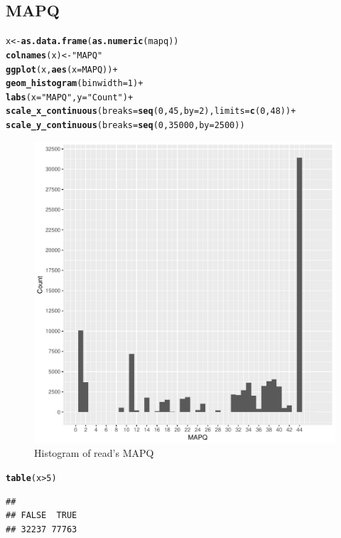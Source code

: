 \documentclass[12pt, a4paper]{article}\usepackage[]{graphicx}\usepackage[]{color}
\makeatletter
\def\maxwidth{ %
  \ifdim\Gin@nat@width>\linewidth
    \linewidth
  \else
    \Gin@nat@width
  \fi
}
\newcommand{\hlnum}[1]{\textcolor[rgb]{0.686,0.059,0.569}{#1}}%
\newcommand{\hlstr}[1]{\textcolor[rgb]{0.192,0.494,0.8}{#1}}%
\newcommand{\hlopt}[1]{\textcolor[rgb]{0,0,0}{#1}}%
\newcommand{\hlstd}[1]{\textcolor[rgb]{0.345,0.345,0.345}{#1}}%
\newcommand{\hlkwb}[1]{\textcolor[rgb]{0.69,0.353,0.396}{#1}}%
\newcommand{\hlkwc}[1]{\textcolor[rgb]{0.333,0.667,0.333}{#1}}%
\newcommand{\hlkwd}[1]{\textcolor[rgb]{0.737,0.353,0.396}{\textbf{#1}}}%
\newenvironment{kframe}{%
 \def\at@end@of@kframe{}%
 \ifinner\ifhmode%
  \def\at@end@of@kframe{\end{minipage}}%
  \begin{minipage}{\columnwidth}%
 \fi\fi%
 \def\FrameCommand##1{\hskip\@totalleftmargin \hskip-\fboxsep
 \colorbox{shadecolor}{##1}\hskip-\fboxsep
     \hskip-\linewidth \hskip-\@totalleftmargin \hskip\columnwidth}%
 \MakeFramed {\advance\hsize-\width
   \@totalleftmargin\z@ \linewidth\hsize
   \@setminipage}}%
 {\par\unskip\endMakeFramed%
 \at@end@of@kframe}
\newenvironment{knitrout}{}{} %
\makeatother
\begin{document}
\subsection{MAPQ}
\begin{knitrout}
\color{fgcolor}\begin{kframe}
\begin{alltt}
\hlstd{x} \hlkwb{<-} \hlkwd{as.data.frame}\hlstd{(}\hlkwd{as.numeric}\hlstd{(mapq))}
\hlkwd{colnames}\hlstd{(x)} \hlkwb{<-} \hlstr{"MAPQ"}
\hlkwd{ggplot}\hlstd{(x,} \hlkwd{aes}\hlstd{(}\hlkwc{x} \hlstd{= MAPQ))} \hlopt{+}
        \hlkwd{geom_histogram}\hlstd{(}\hlkwc{binwidth} \hlstd{=} \hlnum{1}\hlstd{)} \hlopt{+}
        \hlkwd{labs}\hlstd{(}\hlkwc{x} \hlstd{=} \hlstr{"MAPQ"}\hlstd{,} \hlkwc{y} \hlstd{=} \hlstr{"Count"}\hlstd{)} \hlopt{+}
        \hlkwd{scale_x_continuous}\hlstd{(}\hlkwc{breaks} \hlstd{=} \hlkwd{seq}\hlstd{(}\hlnum{0}\hlstd{,} \hlnum{45}\hlstd{,} \hlkwc{by} \hlstd{=} \hlnum{2}\hlstd{),} \hlkwc{limits} \hlstd{=} \hlkwd{c}\hlstd{(}\hlnum{0}\hlstd{,}\hlnum{48}\hlstd{))} \hlopt{+}
        \hlkwd{scale_y_continuous}\hlstd{(}\hlkwc{breaks} \hlstd{=} \hlkwd{seq}\hlstd{(}\hlnum{0}\hlstd{,}\hlnum{35000}\hlstd{,} \hlkwc{by} \hlstd{=} \hlnum{2500}\hlstd{))}
\end{alltt}
\end{kframe}\begin{figure}[h]
\includegraphics[width=\maxwidth]{figure/p1-1} \caption[Histogram of read's MAPQ]{Histogram of read's MAPQ}\label{fig:p1}
\end{figure}

\begin{kframe}\begin{alltt}
\hlkwd{table}\hlstd{(x} \hlopt{>} \hlnum{5}\hlstd{)}
\end{alltt}
\begin{verbatim}
## 
## FALSE  TRUE 
## 32237 77763
\end{verbatim}
\end{kframe}
\end{knitrout}
\clearpage
\end{document}
